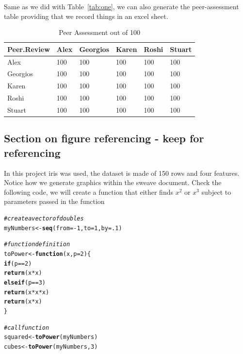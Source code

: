 \documentclass[10pt]{article}\usepackage[]{graphicx}\usepackage[]{color}
\makeatletter
\newcommand{\hlnum}[1]{\textcolor[rgb]{0.686,0.059,0.569}{#1}}%
\newcommand{\hlcom}[1]{\textcolor[rgb]{0.678,0.584,0.686}{\textit{#1}}}%
\newcommand{\hlopt}[1]{\textcolor[rgb]{0,0,0}{#1}}%
\newcommand{\hlstd}[1]{\textcolor[rgb]{0.345,0.345,0.345}{#1}}%
\newcommand{\hlkwa}[1]{\textcolor[rgb]{0.161,0.373,0.58}{\textbf{#1}}}%
\newcommand{\hlkwb}[1]{\textcolor[rgb]{0.69,0.353,0.396}{#1}}%
\newcommand{\hlkwc}[1]{\textcolor[rgb]{0.333,0.667,0.333}{#1}}%
\newcommand{\hlkwd}[1]{\textcolor[rgb]{0.737,0.353,0.396}{\textbf{#1}}}%
\newenvironment{kframe}{%
 \def\at@end@of@kframe{}%
 \ifinner\ifhmode%
  \def\at@end@of@kframe{\end{minipage}}%
  \begin{minipage}{\columnwidth}%
 \fi\fi%
 \def\FrameCommand##1{\hskip\@totalleftmargin \hskip-\fboxsep
 \colorbox{shadecolor}{##1}\hskip-\fboxsep
     \hskip-\linewidth \hskip-\@totalleftmargin \hskip\columnwidth}%
 \MakeFramed {\advance\hsize-\width
   \@totalleftmargin\z@ \linewidth\hsize
   \@setminipage}}%
 {\par\unskip\endMakeFramed%
 \at@end@of@kframe}
\newenvironment{knitrout}{}{} %
\makeatother
\begin{document}

Same as we did with Table~\ref{tab:one}, we can also generate the peer-assessment table providing that we record things in an excel sheet. 

\begin{table}[ht]
\centering
\caption{Peer Assessment out of 100} 
\label{tab:two}
\begin{tabular}{llllll}
  \hline
Peer.Review & Alex & Georgios & Karen & Roshi & Stuart \\ 
  \hline
Alex & 100 & 100 & 100 & 100 & 100 \\ 
  Georgios & 100 & 100 & 100 & 100 & 100 \\ 
  Karen & 100 & 100 & 100 & 100 & 100 \\ 
  Roshi & 100 & 100 & 100 & 100 & 100 \\ 
  Stuart & 100 & 100 & 100 & 100 & 100 \\ 
   \hline
\end{tabular}
\end{table}




\subsection{Section on figure referencing - keep for referencing}\label{explore}


In this project iris was used, the dataset is made of 150 rows and four features. \\

Notice how we generate graphics within the sweave document. Check the following code, we will create a function that either finds $x^2$ or $x^3$ subject to parameters passed in the function
\begin{knitrout}
\color{fgcolor}\begin{kframe}
\begin{alltt}
\hlcom{# create a vector of doubles}
\hlstd{myNumbers} \hlkwb{<-} \hlkwd{seq}\hlstd{(}\hlkwc{from}\hlstd{=}\hlopt{-}\hlnum{1}\hlstd{,}\hlkwc{to}\hlstd{=}\hlnum{1}\hlstd{,}\hlkwc{by}\hlstd{=}\hlnum{.1}\hlstd{)}

\hlcom{# function definition}
\hlstd{toPower} \hlkwb{<-} \hlkwa{function} \hlstd{(}\hlkwc{x}\hlstd{,}\hlkwc{p}\hlstd{=}\hlnum{2}\hlstd{) \{}
    \hlkwa{if} \hlstd{(p}\hlopt{==}\hlnum{2}\hlstd{)}
        \hlkwd{return} \hlstd{(x}\hlopt{*}\hlstd{x)}
    \hlkwa{else if} \hlstd{(p}\hlopt{==}\hlnum{3}\hlstd{)}
        \hlkwd{return} \hlstd{(x}\hlopt{*}\hlstd{x}\hlopt{*}\hlstd{x)}
    \hlkwd{return} \hlstd{(x}\hlopt{*}\hlstd{x)}
\hlstd{\}}

\hlcom{# call function}
\hlstd{squared} \hlkwb{<-} \hlkwd{toPower}\hlstd{(myNumbers)}
\hlstd{cubes} \hlkwb{<-} \hlkwd{toPower}\hlstd{(myNumbers,}\hlnum{3}\hlstd{)}
\end{alltt}
\end{kframe}
\end{knitrout}
\end{document}
